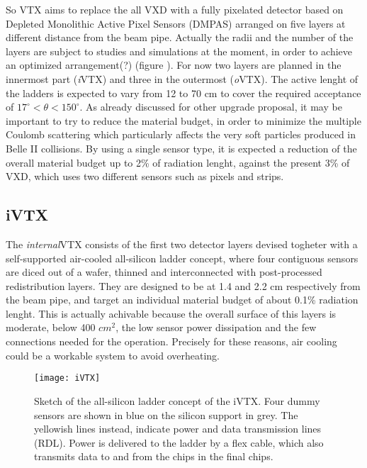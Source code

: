 So VTX aims to replace the all VXD with a fully pixelated detector based on Depleted Monolithic Active Pixel Sensors (DMPAS) arranged on five layers at different distance from the beam pipe. Actually the radii and the number of the layers are subject to studies and simulations at the moment, in order to achieve an optimized arrangement(?) (figure ).  For now two layers are planned in the innermost part (\textit{i}VTX) and three in the outermost (\textit{o}VTX). The active lenght of the ladders is expected to vary from 12 to 70 cm to cover the required acceptance of $17^{\circ} < \theta < 150^{\circ}$.
As already discussed for other upgrade proposal, it may be important to try to reduce the material budget, in order to minimize the multiple Coulomb scattering which particularly affects the very soft particles produced in Belle II collisions. By using a single sensor type, it is expected a reduction of the overall material budget up to 2\% of radiation lenght, against the present 3\% of VXD, which uses two different sensors such as pixels and strips.


\subsection{iVTX}

The \textit{internal}VTX consists of the first two detector layers devised togheter with a self-supported air-cooled all-silicon ladder concept, where four contiguous sensors are diced out of a wafer, thinned and interconnected with post-processed redistribution layers. They are designed to be at 1.4 and 2.2 cm respectively from the beam pipe, and target an individual material budget of about 0.1\% radiation lenght. This is actually achivable because the overall surface of this layers is moderate, below 400 $cm^{2}$, the low sensor power dissipation and the few connections needed for the operation. Precisely for these reasons, air cooling could be a workable system to avoid overheating.


\begin{figure}[h!]
\centering
\texttt{[image: iVTX]}
\caption{Sketch of the all-silicon ladder concept of the iVTX. Four dummy sensors are shown in blue on the silicon support in grey. The yellowish lines instead, indicate power and data transmission lines (RDL). Power is delivered to the ladder by a flex cable, which also transmits data to and from the chips in the final chips.}
\label{fig:iVTX}
\end{figure}

